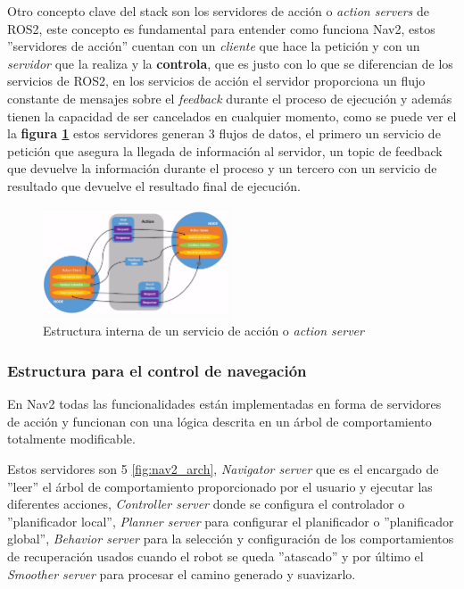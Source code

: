 Otro concepto clave del stack son los servidores de acción o \textit{action servers} de ROS2, este concepto es fundamental para entender como funciona 
Nav2, estos ''servidores de acción'' cuentan con un \textit{cliente} que hace la petición y con un \textit{servidor} que la realiza y la \textbf{controla}, que es 
justo con lo que se diferencian de los servicios de ROS2, en los servicios de acción el servidor proporciona un flujo constante de mensajes sobre el \textit{feedback} 
durante el proceso de ejecución y además tienen la capacidad de ser cancelados en cualquier momento, como se puede ver el la \textbf{figura \ref{fig:servicios_accion}} estos servidores 
generan 3 flujos de datos, el primero un servicio de petición que asegura la llegada de información al servidor, un topic de feedback que devuelve la información durante el proceso y 
un tercero con un servicio de resultado que devuelve el resultado final de ejecución.

\begin{figure}[h]
    \centering
    \includegraphics[width=0.5\textwidth]{images/action_server.png}
    \caption{Estructura interna de un servicio de acción o \textit{action server} \cite{ros2}}
    \label{fig:servicios_accion}
\end{figure}

\subsubsection{Estructura para el control de navegación}

En Nav2 todas las funcionalidades están implementadas en forma de servidores de acción y funcionan con una lógica descrita en un árbol de 
comportamiento totalmente modificable.

Estos servidores son 5 \ref{fig:nav2_arch}, \textit{Navigator server} que es el encargado de ''leer'' el árbol de comportamiento proporcionado por el usuario y ejecutar las 
diferentes acciones, \textit{Controller server} donde se configura el controlador o ''planificador local'', \textit{Planner server} para configurar 
el planificador o ''planificador global'', \textit{Behavior server} para la selección y configuración de los comportamientos de recuperación 
usados cuando el robot se queda ''atascado'' y por último el \textit{Smoother server} para procesar el camino generado y suavizarlo.

